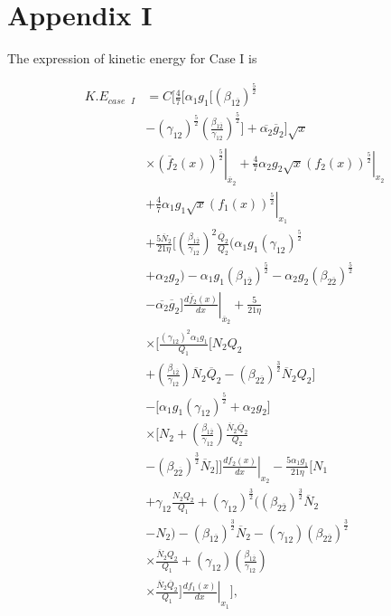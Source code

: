 \documentclass[final,3p,times,twocolumn]{elsarticle}
\begin{document}
\appendix
\section{Appendix I} \label{appendix I}
The expression of kinetic energy for Case I is 
%



 \begin{equation}
 \begin{split}
 K.E_{case\text{ }I} &= C \biggl[\frac{4}{7} \biggl[\alpha_1g_1\biggl[(\beta_{1\overline{2}})^\frac{5}{2}  \\ & - (\gamma_{12})^\frac{5}{2} \left(\frac{\beta_{1\overline{2}}}{\gamma_{12}}\right)^\frac{5}{2} \biggr] + \overline{\alpha_2}\overline{g}_{2}\biggr]  \sqrt{x} \\ &  \times \left. (\overline{f}_{2}(x))^\frac{5}{2} \right|_{\overline{x}_{2}} + \left. \frac{4}{7} \alpha_2g_2  \sqrt{x} (f_2(x))^\frac{5}{2} \right|_{x_2} \\ &  +\left. \frac{4}{7} \alpha_1g_1 \sqrt{x} (f_1(x))^\frac{5}{2}\right|_{x_1}  \\ &  + \frac{5\overline{N}_{2}}{21\eta} \biggl[\left(\frac{\beta_{1\overline{2}}}{\gamma_{12}}\right)^2   \frac{\overline{Q}_{2}}{Q_2}\biggl(\alpha_1g_1(\gamma_{12})^\frac{5}{2} \\ & + \alpha_2g_2\biggr) - \alpha_1g_1 (\beta_{1\overline{2}})^\frac{5}{2}   -\alpha_2g_2 (\beta_{2\overline{2}})^\frac{5}{2}  \\ & - \overline{\alpha_2}\overline{g}_{2} \left. \biggr]\frac{d\overline{f}_{2}(x)}{dx}\right|_{\overline{x}_{2}} + \frac{5}{21\eta} \\ & \times \biggl[\frac{(\gamma_{12})^2 \alpha_{1}g_{1}}{Q_1} \biggl[N_2Q_2  \\ & +\left(\frac{\beta_{1\overline{2}}}{\gamma_{12}}\right)\overline{N}_{2}\overline{Q}_{2}  - (\beta_{2\overline{2}})^\frac{3}{2} \overline{N}_{2}Q_2\biggr] \\ &-\biggl[\alpha_1g_1(\gamma_{12})^\frac{5}{2} + \alpha_2g_2\biggr]\\ & \times \biggl[N_2+\left(\frac{\beta_{1\overline{2}}}{\gamma_{12}}\right)\frac{\overline{N}_{2}\overline{Q}_{2}}{Q_2} \\ & - (\beta_{2\overline{2}})^\frac{3}{2}\overline{N}_{2}\biggr]\left.\biggr]  \frac{df_2(x)}{dx}\right|_{x_2}  - \frac{5\alpha_1g_1}{21\eta}\biggl[ N_1 \\ & + \gamma_{12}\frac{N_2Q_2}{Q_1}    + (\gamma_{12})^\frac{3}{2}  \biggl((\beta_{2\overline{2}})^\frac{3}{2}\overline{N}_{2}  \\ & - N_2\biggr)- (\beta_{1\overline{2}})^\frac{3}{2}\overline{N}_{2}   - (\gamma_{12})(\beta_{2\overline{2}})^\frac{3}{2}\\ & \times \frac{\overline{N}_{2}Q_2}{Q_1}  + (\gamma_{12})\left(\frac{\beta_{1\overline{2}}}{\gamma_{12}}\right) \\ &  \times \frac{\overline{N}_{2}\overline{Q}_{2}}{Q_1}\left. \biggr]\frac{df_1(x)}{dx} \right|_{x_1}\biggr],           
  \label{eqn:kinetic_energy_caseI}
  \end{split}
  \end{equation}
\end{document}
